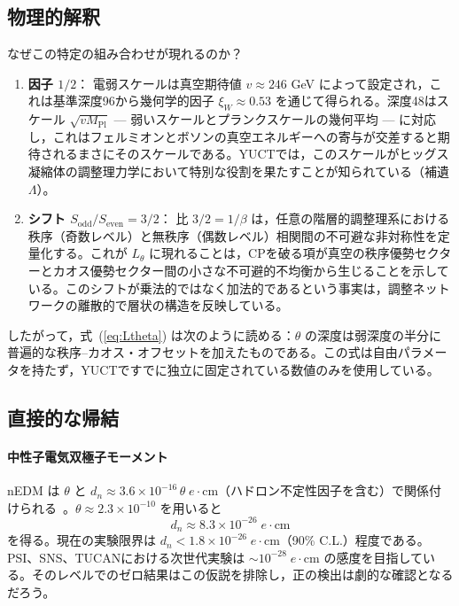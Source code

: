 \documentclass[11pt,a4paper]{article}
\begin{document}
	\subsection{物理的解釈}
	
	なぜこの特定の組み合わせが現れるのか？
	\begin{enumerate}
		\item \textbf{因子 \(1/2\)}： 電弱スケールは真空期待値 \(v \approx 246\) GeV によって設定され，これは基準深度96から幾何学的因子 \(\xi_W \approx 0.53\) を通じて得られる。深度48はスケール \(\sqrt{v M_{\mathrm{Pl}}}\) — 弱いスケールとプランクスケールの幾何平均 — に対応し，これはフェルミオンとボソンの真空エネルギーへの寄与が交差すると期待されるまさにそのスケールである。YUCTでは，このスケールがヒッグス凝縮体の調整理力学において特別な役割を果たすことが知られている（補遺 \(\Lambda\)）。
		\item \textbf{シフト \(S_{\mathrm{odd}}/S_{\mathrm{even}} = 3/2\)}： 比 \(3/2 = 1/\beta\) は，任意の階層的調整理系における秩序（奇数レベル）と無秩序（偶数レベル）相関間の不可避な非対称性を定量化する。これが \(L_\theta\) に現れることは，CPを破る項が真空の秩序優勢セクターとカオス優勢セクター間の小さな不可避的不均衡から生じることを示している。このシフトが乗法的ではなく加法的であるという事実は，調整ネットワークの離散的で層状の構造を反映している。
	\end{enumerate}
	
	したがって，式~(\ref{eq:Ltheta}) は次のように読める：\(\theta\) の深度は弱深度の半分に普遍的な秩序–カオス・オフセットを加えたものである。この式は自由パラメータを持たず，YUCTですでに独立に固定されている数値のみを使用している。
	
	\subsection{直接的な帰結}
	
	\paragraph{中性子電気双極子モーメント}
	nEDM は \(\theta\) と \(d_n \approx 3.6 \times 10^{-16}\,\theta\; e\!\cdot\!\mathrm{cm}\)（ハドロン不定性因子を含む）で関係付けられる~\cite{nEDM2020}。\(\theta \approx 2.3 \times 10^{-10}\) を用いると
	\[
	d_n \approx 8.3 \times 10^{-26}\; e\!\cdot\!\mathrm{cm}
	\]
	を得る。現在の実験限界は \(d_n < 1.8 \times 10^{-26}\; e\!\cdot\!\mathrm{cm}\)（90\% C.L.）程度である。PSI、SNS、TUCANにおける次世代実験は \(\sim 10^{-28}\; e\!\cdot\!\mathrm{cm}\) の感度を目指している。そのレベルでのゼロ結果はこの仮説を排除し，正の検出は劇的な確認となるだろう。
	
\end{document}
